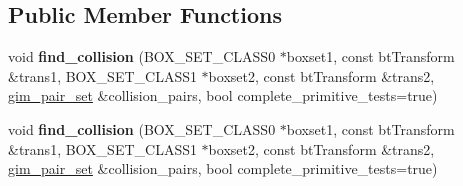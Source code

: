 \subsection*{Public Member Functions}
\begin{DoxyCompactItemize}
\item 
\mbox{\label{classGIM__TREE__TREE__COLLIDER_a1933e264be37ab4761b099974de6e164}} 
void {\bfseries find\+\_\+collision} (B\+O\+X\+\_\+\+S\+E\+T\+\_\+\+C\+L\+A\+S\+S0 $\ast$boxset1, const bt\+Transform \&trans1, B\+O\+X\+\_\+\+S\+E\+T\+\_\+\+C\+L\+A\+S\+S1 $\ast$boxset2, const bt\+Transform \&trans2, \hyperlink{classgim__pair__set}{gim\+\_\+pair\+\_\+set} \&collision\+\_\+pairs, bool complete\+\_\+primitive\+\_\+tests=true)
\item 
\mbox{\label{classGIM__TREE__TREE__COLLIDER_a1933e264be37ab4761b099974de6e164}} 
void {\bfseries find\+\_\+collision} (B\+O\+X\+\_\+\+S\+E\+T\+\_\+\+C\+L\+A\+S\+S0 $\ast$boxset1, const bt\+Transform \&trans1, B\+O\+X\+\_\+\+S\+E\+T\+\_\+\+C\+L\+A\+S\+S1 $\ast$boxset2, const bt\+Transform \&trans2, \hyperlink{classgim__pair__set}{gim\+\_\+pair\+\_\+set} \&collision\+\_\+pairs, bool complete\+\_\+primitive\+\_\+tests=true)
\end{DoxyCompactItemize}
